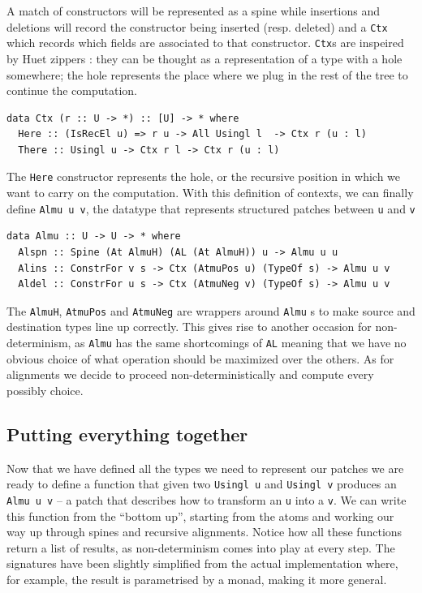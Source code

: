 \documentclass[11pt, titlepage]{article}
\newcommand{\toHaskell}[1]{\texttt{#1}\xspace}
\begin{document}
A match of constructors will be represented as a spine while insertions and 
deletions will record the constructor being inserted (resp. deleted) and a 
\texttt{Ctx} which records which fields are associated to that constructor.
\texttt{Ctx}s are inspeired by Huet zippers \cite{zippers}: they can be thought as a representation 
of a type with a hole somewhere; the hole represents the place where we 
plug in the rest of the tree to continue the computation.

\begin{verbatim}
data Ctx (r :: U -> *) :: [U] -> * where
  Here :: (IsRecEl u) => r u -> All Usingl l  -> Ctx r (u : l)
  There :: Usingl u -> Ctx r l -> Ctx r (u : l)
\end{verbatim}

The \toHaskell{Here} constructor represents the hole, or the recursive position in which we want to carry on the computation.
With this definition of contexts, we can finally define \toHaskell{Almu u v}, the datatype that represents structured patches between \toHaskell{u} and \toHaskell{v}

\begin{verbatim}
data Almu :: U -> U -> * where
  Alspn :: Spine (At AlmuH) (AL (At AlmuH)) u -> Almu u u
  Alins :: ConstrFor v s -> Ctx (AtmuPos u) (TypeOf s) -> Almu u v
  Aldel :: ConstrFor u s -> Ctx (AtmuNeg v) (TypeOf s) -> Almu u v
\end{verbatim}

The \toHaskell{AlmuH}, \toHaskell{AtmuPos} and \toHaskell{AtmuNeg} are wrappers around \toHaskell{Almu}s to make source and destination types line up correctly.
This gives rise to another occasion for non-determinism, as \texttt{Almu} has 
the same shortcomings of \texttt{AL} meaning that we have no obvious choice of 
what operation should be maximized over the others. As for alignments we decide to proceed non-deterministically
and compute every possibly choice. 

\subsection{Putting everything together}\label{putting everything together}

Now that we have defined all the types we need to represent our patches we are ready to define a function that given two \toHaskell{Usingl u} and \toHaskell{Usingl v} produces an \toHaskell{Almu u v} -- a patch that describes how to transform an \toHaskell{u} into a \toHaskell{v}.
We can write this function from the ``bottom up'', starting from the atoms and working our way up through spines and recursive alignments. 
Notice how all these functions return a list of results, as non-determinism comes into play at every step. The signatures have been slightly simplified from the actual implementation where, for example, the result is parametrised by a monad, making it more general.
\end{document}
